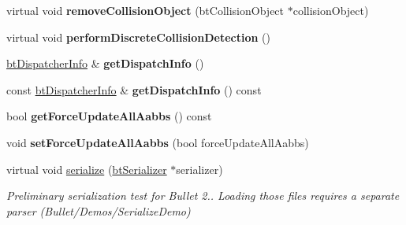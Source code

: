 \begin{DoxyCompactItemize}
\item 
\mbox{\label{classbtCollisionWorld_abeaa861c4f902430934a9a011102e6b7}} 
virtual void {\bfseries remove\+Collision\+Object} (bt\+Collision\+Object $\ast$collision\+Object)
\item 
\mbox{\label{classbtCollisionWorld_a8c15856162fcb6659f2dc84dbdff25d4}} 
virtual void {\bfseries perform\+Discrete\+Collision\+Detection} ()
\item 
\mbox{\label{classbtCollisionWorld_aa6e0fa2c310419c6539a84df107a2ac0}} 
\hyperlink{structbtDispatcherInfo}{bt\+Dispatcher\+Info} \& {\bfseries get\+Dispatch\+Info} ()
\item 
\mbox{\label{classbtCollisionWorld_a8daf7d9ed980e8564a17dfa114f92c6d}} 
const \hyperlink{structbtDispatcherInfo}{bt\+Dispatcher\+Info} \& {\bfseries get\+Dispatch\+Info} () const
\item 
\mbox{\label{classbtCollisionWorld_ab41ca6cd3134844d52a431a27e2edb6d}} 
bool {\bfseries get\+Force\+Update\+All\+Aabbs} () const
\item 
\mbox{\label{classbtCollisionWorld_a482d6276966521c8bf89513830e377a9}} 
void {\bfseries set\+Force\+Update\+All\+Aabbs} (bool force\+Update\+All\+Aabbs)
\item 
\mbox{\label{classbtCollisionWorld_aaa2a4d326b08921dee80256646f438d0}} 
virtual void \hyperlink{classbtCollisionWorld_aaa2a4d326b08921dee80256646f438d0}{serialize} (\hyperlink{classbtSerializer}{bt\+Serializer} $\ast$serializer)
\begin{DoxyCompactList}\small\item\em Preliminary serialization test for Bullet 2.. Loading those files requires a separate parser (Bullet/\+Demos/\+Serialize\+Demo) \end{DoxyCompactList}\end{DoxyCompactItemize}
